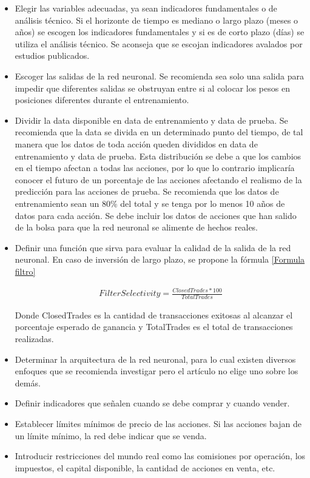 \begin{itemize}
\item Elegir las variables adecuadas, ya sean indicadores fundamentales o de análisis técnico. Si el horizonte de tiempo es mediano o largo plazo (meses o años) se escogen los indicadores fundamentales y si es de corto plazo (días) se utiliza el análisis técnico. Se aconseja que se escojan indicadores avalados por estudios publicados.

\item Escoger las salidas de la red neuronal. Se recomienda sea solo una salida para impedir que diferentes salidas se obstruyan entre si al colocar los pesos en posiciones diferentes durante el entrenamiento.

\item Dividir la data disponible en data de entrenamiento y data de prueba. Se recomienda que la data se divida en un determinado punto del tiempo, de tal manera que los datos de toda acción queden divididos en data de entrenamiento y data de prueba. Esta distribución se debe a que los cambios en el tiempo afectan a todas las acciones, por lo que lo contrario implicaría conocer el futuro de un porcentaje de las acciones afectando el realismo de la predicción para las acciones de prueba. Se recomienda que los datos de entrenamiento sean un 80\% del total y se tenga por lo menos 10 años de datos para cada acción. Se debe incluir los datos de acciones que han salido de la bolsa para que la red neuronal se alimente de hechos reales.

\item Definir una función que sirva para evaluar la calidad de la salida de la red neuronal. En caso de inversión de largo plazo, se propone la fórmula \ref{Formula filtro}

\begin{multline}
\label{Formula filtro}
FilterSelectivity = \frac{ClosedTrades *100}{TotalTrades}
\end{multline}

Donde ClosedTrades es la cantidad de transacciones exitosas al alcanzar el porcentaje esperado de ganancia y TotalTrades es el total de transacciones realizadas.

\item Determinar la arquitectura de la red neuronal, para lo cual existen diversos enfoques que se recomienda investigar pero el artículo no elige uno sobre los demás.

\item Definir indicadores que señalen cuando se debe comprar y cuando vender.

\item Establecer límites mínimos de precio de las acciones. Si las acciones bajan de un límite mínimo, la red debe indicar que se venda.

\item Introducir restricciones del mundo real como las comisiones por operación, los impuestos, el capital disponible, la cantidad de acciones en venta, etc.
\end{itemize}

